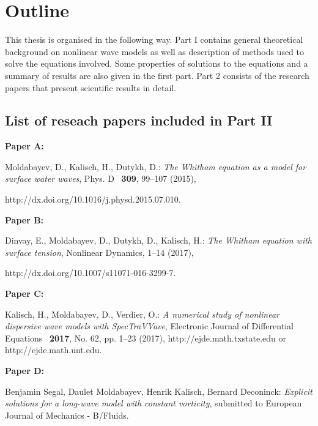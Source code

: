 \chapter{Outline}



This thesis is organised in the following way. Part I contains general theoretical background on nonlinear wave models as well as description of methods used to solve the equations involved. Some properties of solutions to the equations and a summary of results are also given in the first part. Part 2 consists of the research papers that present scientific results in detail. 



\section*{List of reseach papers included in Part II}


\textbf{Paper A:}

\noindent Moldabayev, D., Kalisch, H., Dutykh, D.: \textit{The Whitham equation as a model for surface water waves}, Phys. D~ \textbf{309}, 99–107 (2015),  

\noindent http://dx.doi.org/10.1016/j.physd.2015.07.010.

\vspace{1em}

\noindent \textbf{Paper B:}

\noindent Dinvay, E., Moldabayev, D., Dutykh, D., Kalisch, H.:  \textit{The Whitham equation with surface tension}, Nonlinear Dynamics, 1--14 (2017),  

\noindent http://dx.doi.org/10.1007/s11071-016-3299-7.

\vspace{1em}

\noindent \textbf{Paper C:}

\noindent Kalisch, H., Moldabayev, D., Verdier, O.: \textit{A numerical study of nonlinear dispersive wave models with SpecTraVVave}, Electronic Journal of Differential Equations~ \textbf{2017}, No. 62, pp. 1--23 (2017), http://ejde.math.txstate.edu or http://ejde.math.unt.edu.

\vspace{1em}

\noindent \textbf{Paper D:}

\noindent Benjamin Segal, Daulet Moldabayev, Henrik Kalisch, Bernard Deconinck: \textit{Explicit solutions for a long-wave model with constant vorticity}, submitted to European Journal of Mechanics - B/Fluids.
